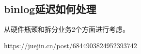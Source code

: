 \documentclass[../../../interview-questions.tex]{subfiles}
\begin{document}
\subsection{binlog延迟如何处理}

从硬件瓶颈和拆分业务2个方面进行考虑。

https://juejin.cn/post/6844903824952393742
\end{document}
